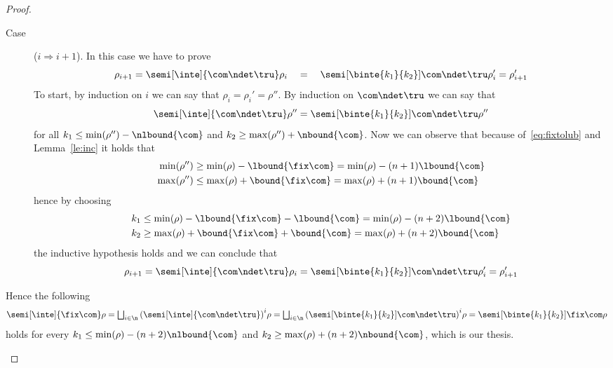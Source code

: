 \begin{proof}
\begin{inductive}
\begin{enumerate}[label=(\roman*)]
\begin{description}
      \item[Case] (\(i\Rightarrow i+1\)). In this case we have to
        prove
        \begin{equation*}
          \rho_{i+1} = \semi[\inte]{\com\ndet\tru}\rho_i \quad = \quad \semi[\binte{k_1}{k_2}]{\com\ndet\tru}\rho_i' = \rho_{i+1}'
        \end{equation*}
        To start, by induction on \(i\) we can say that
        \(\rho_i = \rho_i' = \rho''\). By induction on \(\com\ndet\tru\) we can
        say that
        \begin{equation}
          \semi[\inte]{\com\ndet\tru}\rho'' = \semi[\binte{k_1}{k_2}]{\com\ndet\tru}\rho''
        \end{equation}
        for all \(k_1 \leq \min(\rho'') - \nlbound{\com}\) and
        \(k_2 \geq \max(\rho'') + \nbound{\com}\). Now we can observe
        that because of~\eqref{eq:fixtolub} and Lemma~\ref{le:inc} it
        holds that
        \begin{align*}
          \min(\rho'') & \geq \min(\rho) - \lbound{\fix\com} = \min(\rho) - (n+1)\lbound{\com} \\
          \max(\rho'') & \leq \max(\rho) + \bound{\fix\com} = \max(\rho) + (n+1)\bound{\com}
        \end{align*}
        hence by choosing
        \begin{align*}
          k_1 & \leq \min(\rho) - \lbound{\fix\com} - \lbound{\com} = \min(\rho) - (n+2)\lbound{\com} \\
          k_2 & \geq \max(\rho) + \bound{\fix\com} + \bound{\com} = \max(\rho) + (n+2)\bound{\com}
        \end{align*}
        the inductive hypothesis holds and we can conclude that
        \begin{equation}
          \rho_{i+1} = \semi[\inte]{\com\ndet\tru}\rho_i = \semi[\binte{k_1}{k_2}]{\com\ndet\tru}\rho_i' = \rho_{i+1}'
        \end{equation}
      \end{description}
      Hence the following
      \begin{equation*}
        \semi[\inte]{\fix\com}\rho =
        \textstyle\bigsqcup_{i\in\n}{\left(\semi[\inte]{\com\ndet\tru}\right)}^i \rho =
        \textstyle\bigsqcup_{i\in\n}{\left(\semi[\binte{k_1}{k_2}]{\com\ndet\tru}\right)}^i \rho =
        \semi[\binte{k_1}{k_2}]{\fix\com}\rho
      \end{equation*}
      holds for every \(k_1 \leq \min(\rho) - (n+2)\nlbound{\com}\) and
      \(k_2 \geq \max(\rho) + (n+2)\nbound{\com}\), which is our
      thesis.
    \end{enumerate}
  \end{inductive}
\end{proof}

